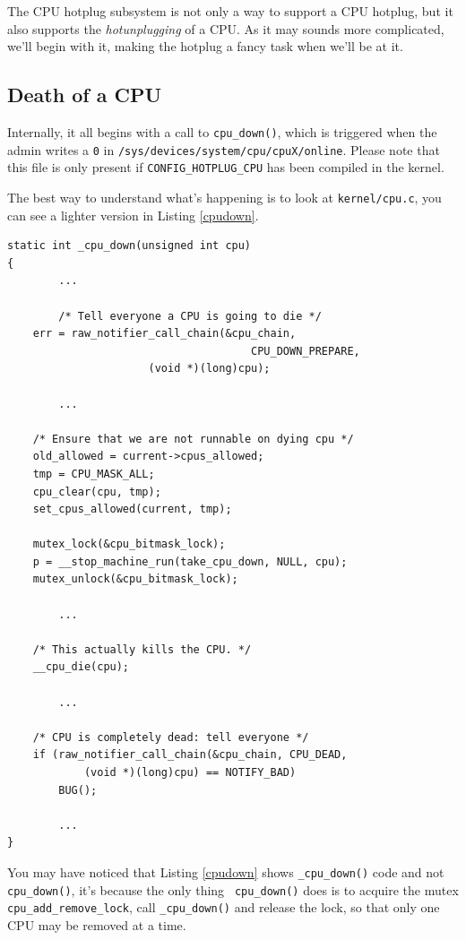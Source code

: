 \documentclass{report}
\renewcommand{\tt}[1]{\texttt{{{#1}}}}
\begin{document}
The CPU hotplug subsystem is not only a way to support a CPU hotplug, but it
also supports the {\em hotunplugging} of a CPU. As it may sounds more
complicated, we'll begin with it, making the hotplug a fancy task when we'll be
at it.

\subsection{Death of a CPU}

Internally, it all begins with a call to \tt{cpu\_down()}, which is triggered
when the admin writes a \tt{0} in
\tt{/sys/devices/system/cpu/cpuX/online}. Please note that this file is only
present if \tt{CONFIG\_HOTPLUG\_CPU} has been compiled in the kernel.

The best way to understand what's happening is to look at \tt{kernel/cpu.c}, you can see a
lighter version in Listing \ref{cpudown}.

\begin{lstlisting}[caption=\tt{\_cpu\_down()}{{,}} \tt{kernel/cpu.c},label=cpudown]
static int _cpu_down(unsigned int cpu)
{
        ...

        /* Tell everyone a CPU is going to die */
	err = raw_notifier_call_chain(&cpu_chain,
                                      CPU_DOWN_PREPARE,
				      (void *)(long)cpu);

        ...

	/* Ensure that we are not runnable on dying cpu */
	old_allowed = current->cpus_allowed;
	tmp = CPU_MASK_ALL;
	cpu_clear(cpu, tmp);
	set_cpus_allowed(current, tmp);

	mutex_lock(&cpu_bitmask_lock);
	p = __stop_machine_run(take_cpu_down, NULL, cpu);
	mutex_unlock(&cpu_bitmask_lock);

        ...

	/* This actually kills the CPU. */
	__cpu_die(cpu);

        ...

	/* CPU is completely dead: tell everyone */
	if (raw_notifier_call_chain(&cpu_chain, CPU_DEAD,
			(void *)(long)cpu) == NOTIFY_BAD)
		BUG();

        ...
}
\end{lstlisting}

You may have noticed that Listing \ref{cpudown} shows \tt{\_cpu\_down()} code
and not \tt{cpu\_down()}, it's because the only thing \tt{ cpu\_down()} does is
to acquire the mutex \tt{cpu\_add\_remove\_lock}, call \tt{\_cpu\_down()} and
release the lock, so that only one CPU may be removed at a time.
\end{document}
